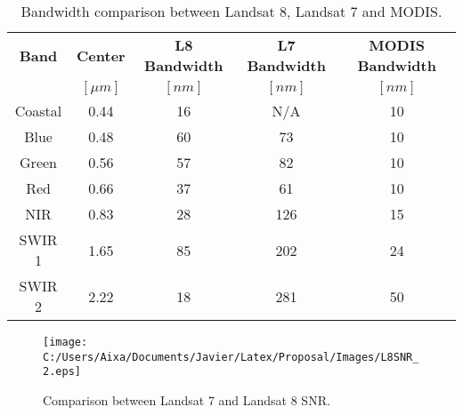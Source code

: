 \begin{table}[!ht]
\caption{ Bandwidth comparison between Landsat 8, Landsat 7 and MODIS. \label{tab:bandwidth}} 
\centering
      \begin{tabular}{c|c|c|c|c}
          \bfseries{Band}& \bfseries{Center}   & \bfseries{L8 Bandwidth} & \bfseries{L7 Bandwidth} & \bfseries{MODIS Bandwidth} \\ 
                  & \bfseries{$[\mu m]$} & $[nm]$   & $[nm]$ & $[nm]$   \\ \hline \hline
          Coastal & 0.44 & 16 & N/A & 10  \\
          Blue    & 0.48 & 60 & 73  & 10  \\
          Green   & 0.56 & 57 & 82  & 10  \\
          Red     & 0.66 & 37 & 61  & 10  \\  
          NIR     & 0.83 & 28 & 126 & 15  \\
          SWIR 1  & 1.65 & 85 & 202 & 24  \\
          SWIR 2  & 2.22 & 18 & 281 & 50  \\ 
       \end{tabular}
\end{table}

\begin{figure}[htb]
\centering
      \texttt{[image: C:/Users/Aixa/Documents/Javier/Latex/Proposal/Images/L8SNR\_2.eps]}
      \caption{Comparison between Landsat 7 and Landsat 8 SNR. \label{fig:L8SNR} } 
      \label{fig:olisnr}
\end{figure}

